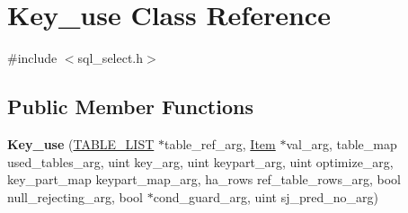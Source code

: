 \hypertarget{classKey__use}{}\section{Key\+\_\+use Class Reference}
\label{classKey__use}


{\ttfamily \#include $<$sql\+\_\+select.\+h$>$}

\subsection*{Public Member Functions}
\begin{DoxyCompactItemize}
\item 
\mbox{\label{classKey__use_aa32d5d1bc045beb21ae82475e60ed399}} 
{\bfseries Key\+\_\+use} (\mbox{\hyperlink{structTABLE__LIST}{T\+A\+B\+L\+E\+\_\+\+L\+I\+ST}} $\ast$table\+\_\+ref\+\_\+arg, \mbox{\hyperlink{classItem}{Item}} $\ast$val\+\_\+arg, table\+\_\+map used\+\_\+tables\+\_\+arg, uint key\+\_\+arg, uint keypart\+\_\+arg, uint optimize\+\_\+arg, key\+\_\+part\+\_\+map keypart\+\_\+map\+\_\+arg, ha\+\_\+rows ref\+\_\+table\+\_\+rows\+\_\+arg, bool null\+\_\+rejecting\+\_\+arg, bool $\ast$cond\+\_\+guard\+\_\+arg, uint sj\+\_\+pred\+\_\+no\+\_\+arg)
\end{DoxyCompactItemize}
